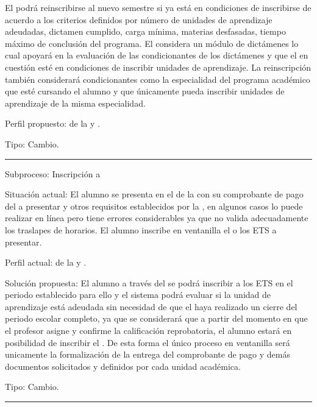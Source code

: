 \begin{Cdescription}
		
	El  podrá reinscribirse al nuevo semestre si ya está en condiciones de inscribirse de acuerdo a los criterios definidos por número de unidades de aprendizaje adeudadas, dictamen cumplido, carga mínima, materias desfasadas, tiempo máximo de conclusión del programa. El  considera un módulo de dictámenes lo cual apoyará en la evaluación de las condicionantes de los dictámenes y que el  en cuestión esté en condiciones de inscribir unidades de aprendizaje. La reinscripción también considerará condicionantes como la especialidad del programa académico que esté cursando el alumno y que únicamente pueda inscribir unidades de aprendizaje de la misma especialidad.
	 
	\item[Perfil propuesto:]  de la  y .
	\item[Tipo:] Cambio.\\
	
\end{Cdescription}
\hrule

\begin{Cdescription}
	\item[Subproceso:] Inscripción a 
	\item[Situación actual:] 
	El alumno se presenta en el  de la  con su comprobante de pago del  a presentar y otros requisitos establecidos por la , en algunos casos lo puede realizar en línea pero tiene errores considerables ya que no valida adecuadamente los traslapes de horarios. El alumno inscribe en ventanilla el o los ETS a presentar.
	\item[Perfil actual:]  de la  y .
	\item[Solución propuesta:] El alumno a través del  se podrá inscribir a los ETS en el periodo establecido para ello y el sistema podrá evaluar si la unidad de aprendizaje está adeudada sin necesidad de que el  haya realizado un cierre del periodo escolar completo, ya que se considerará que a partir del momento en que el profesor asigne y confirme la calificación reprobatoria, el alumno estará en posibilidad de inscribir el . De esta forma el único proceso en ventanilla será unicamente la formalización de la entrega del comprobante de pago y demás documentos solicitados y definidos por cada unidad académica.
	
	\item[Tipo:] Cambio.\\
	
\end{Cdescription}
\hrule